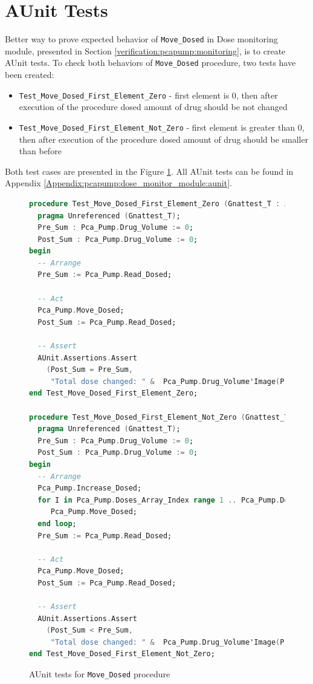 \section{AUnit Tests}
\label{verification:aunit}

Better way to prove expected behavior of \lstinline{Move_Dosed} in Dose monitoring module, presented in Section \ref{verification:pcapump:monitoring}, is to create AUnit tests. To check both behaviors of \lstinline{Move_Dosed} procedure, two tests have been created:
\begin{itemize}
    \item \lstinline{Test_Move_Dosed_First_Element_Zero} - first element is 0, then after execution of the procedure dosed amount of drug should be not changed
    \item \lstinline{Test_Move_Dosed_First_Element_Not_Zero} - first element is greater than 0, then after execution of the procedure dosed amount of drug should be smaller than before
\end{itemize}

Both test cases are presented in the Figure \ref{listing:pca_pump_move_dosed_unit_tests}. All AUnit tests can be found in Appendix \ref{Appendix:pcapump:dose_monitor_module:aunit}.

\begin{figure}
\singlespacing
\begin{lstlisting}[language=ada, frame=single, gobble=0]
procedure Test_Move_Dosed_First_Element_Zero (Gnattest_T : in out Test) is
  pragma Unreferenced (Gnattest_T);
  Pre_Sum : Pca_Pump.Drug_Volume := 0;
  Post_Sum : Pca_Pump.Drug_Volume := 0;
begin
  -- Arrange
  Pre_Sum := Pca_Pump.Read_Dosed;

  -- Act
  Pca_Pump.Move_Dosed;
  Post_Sum := Pca_Pump.Read_Dosed;

  -- Assert
  AUnit.Assertions.Assert
    (Post_Sum = Pre_Sum,
     "Total dose changed: " &  Pca_Pump.Drug_Volume'Image(Pre_Sum) & " /= " &  Pca_Pump.Drug_Volume'Image(Post_Sum));
end Test_Move_Dosed_First_Element_Zero;

procedure Test_Move_Dosed_First_Element_Not_Zero (Gnattest_T : in out Test) is
  pragma Unreferenced (Gnattest_T);
  Pre_Sum : Pca_Pump.Drug_Volume := 0;
  Post_Sum : Pca_Pump.Drug_Volume := 0;
begin
  -- Arrange
  Pca_Pump.Increase_Dosed;
  for I in Pca_Pump.Doses_Array_Index range 1 .. Pca_Pump.Doses_Array_Index'Last-1 loop
     Pca_Pump.Move_Dosed;
  end loop;
  Pre_Sum := Pca_Pump.Read_Dosed;

  -- Act
  Pca_Pump.Move_Dosed;
  Post_Sum := Pca_Pump.Read_Dosed;

  -- Assert
  AUnit.Assertions.Assert
    (Post_Sum < Pre_Sum,
     "Total dose changed: " &  Pca_Pump.Drug_Volume'Image(Pre_Sum) & " should be greater than " &  Pca_Pump.Drug_Volume'Image(Post_Sum));
end Test_Move_Dosed_First_Element_Not_Zero;
\end{lstlisting}
\doublespacing
\caption{AUnit tests for \lstinline{Move_Dosed} procedure}
\label{listing:pca_pump_move_dosed_unit_tests}
\end{figure}


